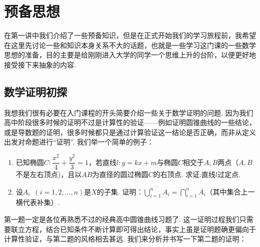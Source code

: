 
\chapter{预备思想}

在第一讲中我们介绍了一些预备知识，但是在正式开始我们的学习旅程前，我希望在这里先讨论一些和知识本身关系不大的话题，也就是一些学习这门课的一些数学思想的准备，目的主要是给刚刚进入大学的同学一个思维上升的台阶，以便更好地接受接下来抽象的内容.

\section{数学证明初探}

我想我们很有必要在入门课程的开头简要介绍一些关于数学证明的问题. 因为我们高中阶段很多时候的证明不过是计算性的验证——例如证明圆锥曲线的一些结论，或是导数题的证明，很多时候都只是通过计算验证这一结论是否正确，而非从定义出发对命题进行``证明''. 我们举一个简单的例子：

\begin{example}
    \begin{enumerate}
        \item 已知椭圆$C:\dfrac{x^2}{4}+\dfrac{y^2}{3}=1$，若直线$l:y=kx+m$与椭圆$C$相交于$A,B$两点（$A,B$不是左右顶点)，且以$AB$为直径的圆过椭圆$C$的右顶点. 求证:直线$l$过定点.

        \item 设$A_i\enspace(i=1,2,\ldots,n)$是$X$的子集. 证明：$\overline{\displaystyle\bigcup_{i=1}^nA_i}=\displaystyle\bigcap_{i=1}^n\overline{A_i}$（其中集合上一横代表补集）.
    \end{enumerate}
\end{example}

第一题一定是各位再熟悉不过的经典高中圆锥曲线习题了. 这一证明过程我们只需要联立方程，结合已知条件不断计算即可得出结论，事实上虽是证明题确更偏向于计算性验证，与第二题的风格相去甚远. 我们来分析并书写一下第二题的证明：

